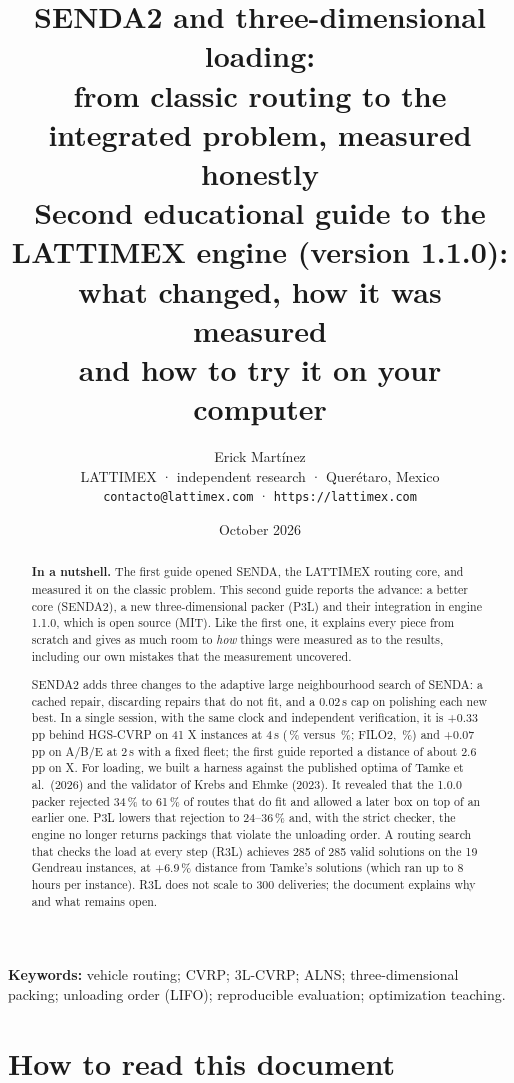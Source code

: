 \documentclass[11pt,a4paper]{article}
\title{\textbf{SENDA2 and three-dimensional loading:\\ from classic routing to the integrated problem, measured honestly}\\[0.4em]
\large Second educational guide to the LATTIMEX engine (version 1.1.0): what changed, how it was measured\\ and how to try it on your computer}
\author{Erick Martínez\\
\small LATTIMEX · independent research · Querétaro, Mexico\\
\small \texttt{contacto@lattimex.com} · \texttt{https://lattimex.com}}
\date{October 2026}
\newcommand{\senda}{SENDA}
\newcommand{\sendados}{SENDA2}
\newcommand{\pp}{\,pp}
\begin{document}
\maketitle
\thispagestyle{licenciaguia}

\begin{abstract}
\noindent\textbf{In a nutshell.} The first guide opened \senda, the LATTIMEX routing core, and measured
it on the classic problem. This second guide reports the advance: a better core (\sendados), a new
three-dimensional packer (P3L) and their integration in engine 1.1.0, which is open source (MIT). Like
the first one, it explains every piece from scratch and gives as much room to \emph{how} things were
measured as to the results, including our own mistakes that the measurement uncovered.

\smallskip
\noindent \sendados{} adds three changes to the adaptive large neighbourhood search of \senda: a
cached repair, discarding repairs that do not fit, and a 0.02\,s cap on polishing each new best. In a
single session, with the same clock and independent verification, it is +0.33\pp{} behind HGS-CVRP on
41 X instances at 4\,s (\SendaDosX\,\% versus \HgsX\,\%; FILO2, \FiloX\,\%) and +0.07\pp{} on A/B/E at
2\,s with a fixed fleet; the first guide reported a distance of about 2.6\pp{} on X. For loading, we
built a harness against the published optima of Tamke et al.\ (2026) and the validator of Krebs and
Ehmke (2023). It revealed that the 1.0.0 packer rejected 34\,\% to 61\,\% of routes that do fit and
allowed a later box on top of an earlier one. P3L lowers that rejection to 24--36\,\% and, with the
strict checker, the engine no longer returns packings that violate the unloading order. A routing
search that checks the load at every step (R3L) achieves 285 of 285 valid solutions on the 19 Gendreau
instances, at +6.9\,\% distance from Tamke's solutions (which ran up to 8 hours per instance). R3L does
not scale to 300 deliveries; the document explains why and what remains open.
\end{abstract}

\noindent\textbf{Keywords:} vehicle routing; CVRP; 3L-CVRP; ALNS; three-dimensional packing; unloading
order (LIFO); reproducible evaluation; optimization teaching.

\tableofcontents
\newpage

\section*{How to read this document}
\end{document}
